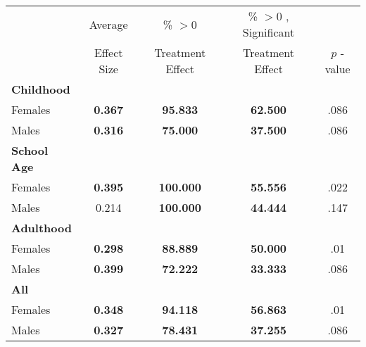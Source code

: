 \begin{tabular}{l c c c c}
\toprule
 & Average & \% $ >0 $ & \% $ >0 $ , Significant & \citet{Rosenbaum_2005_Distribution_JRSS} \\
 & Effect Size & Treatment Effect & Treatment Effect & $ p $ -value \\
\midrule
\textbf{Childhood} & & & & \\
\quad Females &  \textbf{    0.367} & \textbf{   95.833} & \textbf{   62.500} & .086 \\
\quad Males &  \textbf{    0.316} & \textbf{   75.000} & \textbf{   37.500} & .086 \\
\midrule
\textbf{School Age} & & & & \\
\quad Females &  \textbf{    0.395} & \textbf{  100.000} & \textbf{   55.556} & .022 \\
\quad Males &      0.214 & \textbf{  100.000} & \textbf{   44.444} & .147 \\
\midrule
\textbf{Adulthood} & & & & \\
\quad Females &  \textbf{    0.298} & \textbf{   88.889} & \textbf{   50.000} & .01 \\
\quad Males &  \textbf{    0.399} & \textbf{   72.222} & \textbf{   33.333} & .086 \\
\midrule
\textbf{All} & & & & \\
\quad Females &  \textbf{    0.348} & \textbf{   94.118} & \textbf{   56.863} & .01 \\
\quad Males &  \textbf{    0.327} & \textbf{   78.431} & \textbf{   37.255} & .086 \\
\bottomrule
\end{tabular}
